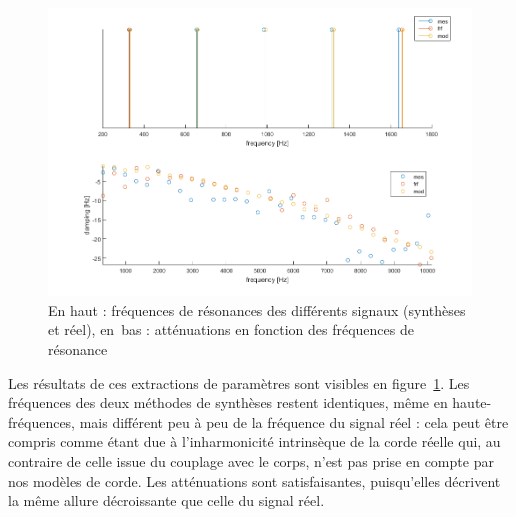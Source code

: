 \begin{figure}[hpbt]
\centering
\includegraphics[width=\linewidth]{figures/apotheose.png}
\caption{En haut : fréquences de résonances des différents signaux (synthèses et réel), en~bas : atténuations en fonction des fréquences de résonance%
\label{fig:apo}}
\end{figure}

Les résultats de ces extractions de paramètres sont visibles en figure~\ref{fig:apo}. Les fréquences des deux méthodes de synthèses restent identiques, même en haute-fréquences, mais différent peu à peu de la fréquence du signal réel : cela peut être compris comme étant due à l'inharmonicité intrinsèque de la corde réelle qui, au contraire de celle issue du couplage avec le corps, n'est pas prise en compte par nos modèles de corde. Les atténuations sont satisfaisantes, puisqu'elles décrivent la même allure décroissante que celle du signal réel.

